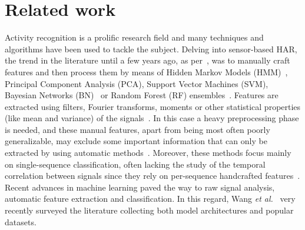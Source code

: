 
\section{Related work}
\label{sec:related_work}

Activity recognition is a prolific research field and many techniques and algorithms have been used to tackle the subject.
Delving into sensor-based HAR, the trend in the literature until a few years ago, as per~\cite{Lara-Survey-Wearable}, was to manually craft features and then process them by means of Hidden Markov Models (HMM)~\cite{Liano-HMM}, Principal Component Analysis (PCA), Support Vector Machines (SVM), Bayesian Networks (BN)~\cite{Altun-IMU} or Random Forest (RF) ensembles~\cite{Feng-RF}.
Features are extracted using filters, Fourier transforms, moments or other statistical properties (like mean and variance) of the signals~\cite{FrankNadales}.
In this case a heavy preprocessing phase is needed, and these manual features, apart from being most often poorly generalizable, may exclude some important information that can only be extracted by using automatic methods~\cite{Wang-survey}.
Moreover, these methods focus mainly on single-sequence classification, often lacking the study of the temporal correlation between signals since they rely on per-sequence handcrafted features~\cite{Hammerla-DeepConvRec}.
Recent advances in machine learning paved the way to raw signal analysis, automatic feature extraction and classification. In this regard, Wang \textit{et al.}~\cite{Wang-survey} very recently surveyed the literature collecting both model architectures and popular datasets.


